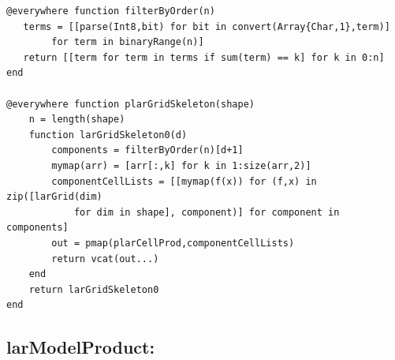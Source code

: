 \documentclass{article}
\begin{document}
\begin{flushleft}
\begin{list}{}{}
\begin{Verbatim}[tabsize=4]
@everywhere function filterByOrder(n)
   terms = [[parse(Int8,bit) for bit in convert(Array{Char,1},term)]
		for term in binaryRange(n)]
   return [[term for term in terms if sum(term) == k] for k in 0:n]
end

@everywhere function plarGridSkeleton(shape)
    n = length(shape)
    function larGridSkeleton0(d)
        components = filterByOrder(n)[d+1]
        mymap(arr) = [arr[:,k] for k in 1:size(arr,2)]
        componentCellLists = [[mymap(f(x)) for (f,x) in zip([larGrid(dim) 
			for dim in shape], component)] for component in components]
		out = pmap(plarCellProd,componentCellLists)
        return vcat(out...)
    end
    return larGridSkeleton0
end   
   \end{Verbatim}
\end{list}
\footnotesize\addtolength{\baselineskip}{-1ex}
\end{flushleft}
\vspace{2ex}

\subsection{larModelProduct:}
\end{document}
